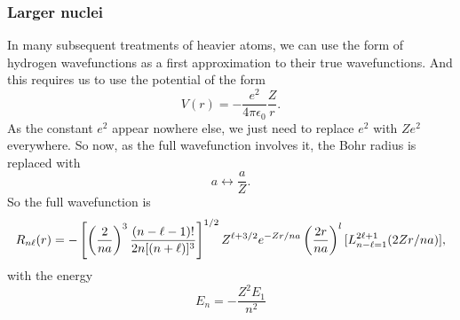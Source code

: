 \subsubsection{Larger nuclei}
In many subsequent treatments of heavier atoms, we can use the form of 
hydrogen wavefunctions as a first approximation to their true wavefunctions. 
And this requires us to use the potential of the form 
\begin{equation}
V(r)=-\frac{e^2}{4\pi\epsilon_0}\frac{Z}{r}. 
\end{equation}
As the constant $e^2$ appear nowhere else, we just need to replace $e^2$ 
with $Ze^2$ everywhere. So now, as the full wavefunction involves it, the Bohr radius is replaced with 
\begin{equation}
a\leftrightarrow\frac{a}{Z}.
\end{equation}
So the full wavefunction is 
\begin{equation}
R_{n\ell}(r)=-\left[\left(\frac{2}{na}\right)^3\frac{(n-\ell-1)!}{2n[(n+\ell)]^3} \right]^{1/2}Z^{\ell+3/2}e^{-Zr/na}\left(\frac{2r}{na} \right)^l[L^{2\ell+1}_{n-\ell=1}(2Zr/na)], 
\end{equation}
with the energy
\begin{equation}
E_n=-\frac{Z^2E_1}{n^2}
\end{equation}
